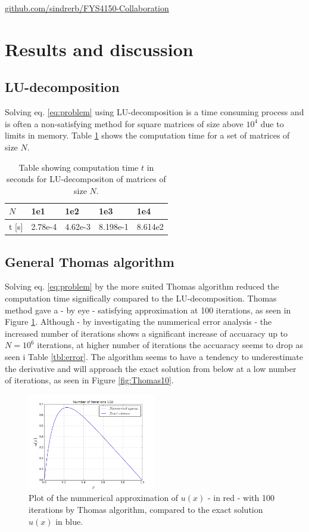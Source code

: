 \documentclass[twoside,twocolumn]{article}
\begin{document}
\begin{center}
 \href{https://github.com/sindrerb/FYS4150-Collaboration}{github.com/sindrerb/FYS4150-Collaboration}
\end{center}

\newpage
\section{Results and discussion}
\subsection{LU-decomposition}
Solving eq. \ref{eq:problem} using LU-decomposition is a time consuming process and is often a non-satisfying method for square matrices of size above $10^4$ due to limits in memory. Table \ref{tbl:time_LU} shows the computation time for a set of matrices of size $N$.
\begin{table}[h]
\begin{tabular}{|l|l|l|l|l|} \hline
$N$ & 1e1 & 1e2 & 1e3 & 1e4\\ \hline
t [s] & 2.78e-4 &4.62e-3 & 8.198e-1 & 8.614e2\\ \hline
\end{tabular}
\caption{Table showing computation time $t$ in seconds for LU-decompositon of matrices of size $N$.} \label{tbl:time_LU}
\end{table}
\subsection{General Thomas algorithm}
Solving eq. \ref{eq:problem} by the more suited Thomas algorithm reduced the computation time significally compared to the LU-decomposition. Thomas method gave a - by eye - satisfying approximation at 100 iterations, as seen in Figure \ref{fig:Thomas1E2}. Although - by investigating the nummerical error analysis - the increased number of iterations shows a significant increase of accuaracy up to $N=10^6$ iterations, at higher number of iterations the accuaracy seems to drop as seen i Table \ref{tbl:error}.
The algorithm seems to have a tendency to underestimate the derivative and will approach the exact solution from below at a low number of iterations, as seen in Figure \ref{fig:Thomas10}.

\begin{figure}[htp]
\includegraphics[width=0.5\textwidth]{./figures/b-run1e2.png} 
\caption{Plot of the nummerical approximation of $u(x)$ - in red - with 100 iterations by Thomas algorithm, compared to the exact solution $u(x)$ in blue.} \label{fig:Thomas1E2}
\end{figure}
\end{document}
